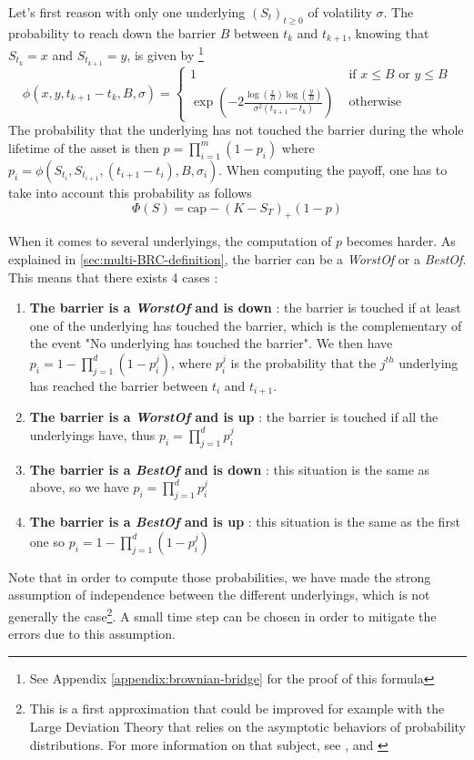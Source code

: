 \documentclass[a4paper,11pt,english]{book}
\begin{document}
Let's first reason with only one underlying $(S_{t})_{t\geq0}$ of volatility $\sigma$. The probability to reach down the barrier $B$ between $t_{k}$ and $t_{k+1}$, knowing that $S_{t_{k}}=x$ and $S_{t_{k+1}}=y$, is given by \footnote{See Appendix \ref{appendix:brownian-bridge} for the proof of this formula}
$$\phi(x,y,t_{k+1}-t_k,B,\sigma) = 
\begin{cases}
1 &\text{ if } x\leq B \text{ or } y\leq B \\
\exp\left(-2\frac{\log(\frac{x}{B})\log(\frac{y}{B})}{\sigma^{2}(t_{k+1}-t_k)}\right) &\text{ otherwise }
\end{cases}$$
The probability that the underlying has not touched the barrier during the whole lifetime of the asset is then $p=\prod_{i=1}^{m}(1-p_{i})$ where $p_{i}=\phi(S_{t_{i}},S_{t_{i+1}},(t_{i+1}-t_i),B,\sigma_{i})$. When computing the payoff, one has to take into account this probability as follows
$$\Phi(S) = \text{cap} -(K-S_{T})_{+}(1-p)$$

When it comes to several underlyings, the computation of $p$ becomes harder. As explained in \ref{sec:multi-BRC-definition}, the barrier can be a \textit{WorstOf} or a \textit{BestOf}. This means that there exists 4 cases :
\begin{enumerate}
    \item \textbf{The barrier is a \textit{WorstOf} and is down} : the barrier is touched if at least one of the underlying has touched the barrier, which is the complementary of the event "No underlying has touched the barrier". We then have $p_{i}=1-\prod_{j=1}^{d}(1-p_{i}^{j})$, where $p_{i}^{j}$ is the probability that the $j^{th}$ underlying has reached the barrier between $t_{i}$ and $t_{i+1}$.
    
    \item \textbf{The barrier is a \textit{WorstOf} and is up} : the barrier is touched if all the underlyings have, thus $p_{i}=\prod_{j=1}^{d}p_{i}^{j}$
    
    \item \textbf{The barrier is a \textit{BestOf} and is down} : this situation is the same as above, so we have $p_{i}=\prod_{j=1}^{d}p_{i}^{j}$
    
    \item \textbf{The barrier is a \textit{BestOf} and is up} : this situation is the same as the first one so  $p_{i}=1-\prod_{j=1}^{d}(1-p_{i}^{j})$
\end{enumerate}
Note that in order to compute those probabilities, we have made the strong assumption of independence between the different underlyings, which is not generally the case\footnote{This is a first approximation that could be improved for example with the Large Deviation Theory that relies on the asymptotic behaviors of probability distributions. For more information on that subject, see \cite{baldi1995exact}, \cite{baldi1999pricing} and \cite{huh2008computation}}. A small time step can be chosen in order to mitigate the errors due to this assumption.
\end{document}

